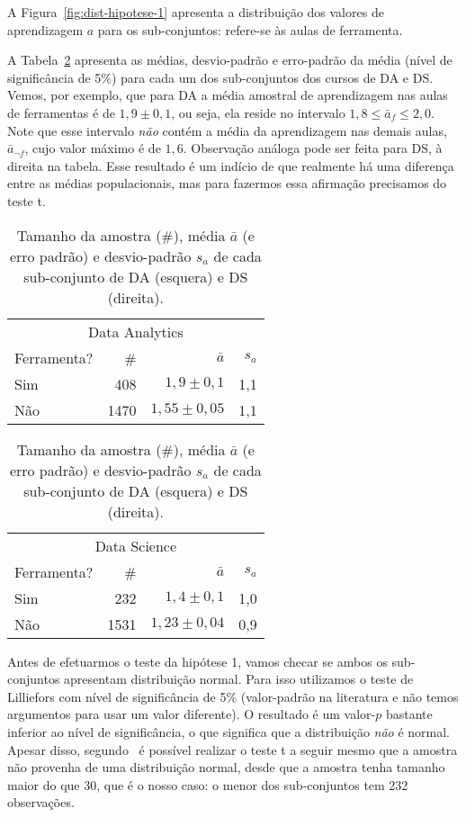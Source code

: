 A Figura~\ref{fig:dist-hipotese-1} apresenta a distribuição dos valores de aprendizagem $a$ para os sub-conjuntos:  refere-se às aulas de ferramenta.

A Tabela~\ref{tab:dist-hipotese-1} apresenta as médias, desvio-padrão e erro-padrão da média (nível de significância de 5\%) para cada um dos sub-conjuntos dos cursos de DA e DS.
Vemos, por exemplo, que para DA a média amostral de aprendizagem nas aulas de ferramentas é de $1,9\pm{0,1}$, ou seja, ela reside no intervalo $1,8 \le \bar a_f \le 2,0$.
Note que esse intervalo \emph{não} contém a média da aprendizagem nas demais aulas, $\bar a_{\neg f}$, cujo valor máximo é de $1,6$.
Observação análoga pode ser feita para DS, à direita na tabela.
Esse resultado é um indício de que realmente há uma diferença entre as médias populacionais, mas para fazermos essa afirmação precisamos do teste t.

\begin{table}
	\caption{Tamanho da amostra (\#), média $\bar a$ (e erro padrão) e desvio-padrão $s_a$ de cada sub-conjunto de DA (esquera) e DS (direita).}
	\label{tab:dist-hipotese-1}
	\centering
	\begin{minipage}{0.45\textwidth}
		\begin{tabular}{lrrr}
			\toprule
			\multicolumn{4}{c}{Data Analytics}\\
			Ferramenta? & \# & $\bar{a}$ & $s_a$ \\
			\midrule
			Sim &  408 & $1,9\pm 0,1$ & 1,1 \\
			Não & 1470 & $1,55 \pm 0,05$ & 1,1 \\
			\bottomrule
		\end{tabular}
	\end{minipage}\hfill
	\begin{minipage}{0.45\textwidth}
		\begin{tabular}{lrrr}
			\toprule
			\multicolumn{4}{c}{Data Science}\\
			Ferramenta? & \# & $\bar{a}$ & $s_a$ \\
			\midrule
			Sim &  232 & $1,4\pm 0,1$ & 1,0 \\
			Não & 1531 & $1,23\pm 0,04$ & 0,9 \\
			\bottomrule
		\end{tabular}
	\end{minipage}
\end{table}

Antes de efetuarmos o teste da hipótese 1, vamos checar se ambos os sub-conjuntos apresentam distribuição normal.
Para isso utilizamos o teste de Lilliefors com nível de significância de 5\% (valor-padrão na literatura e não temos argumentos para usar um valor diferente).
O resultado é um valor-$p$ bastante inferior ao nível de significância, o que significa que a distribuição \emph{não} é normal.
Apesar disso, segundo~\cite[p.~259]{Triola2005} é possível realizar o teste t a seguir mesmo que a amostra não provenha de uma distribuição normal, desde que a amostra tenha tamanho maior do que 30, que é o nosso caso: o menor dos sub-conjuntos tem 232 observações.

